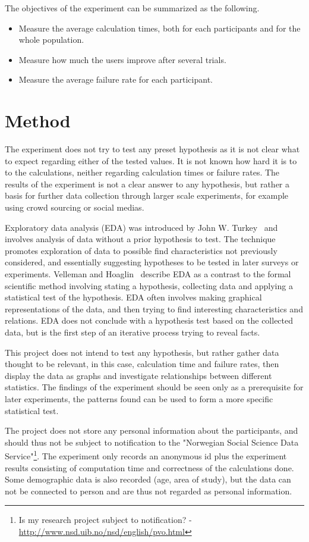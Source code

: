 \par The objectives of the experiment can be summarized as the following.
\begin{itemize}
    \item Measure the average calculation times, both for each participants and for the whole population.
    \item Measure how much the users improve after several trials.
    \item Measure the average failure rate for each participant.
\end{itemize}


\section{Method}
The experiment does not try to test any preset hypothesis as it is not clear what to expect regarding either of the tested values. It is not known how hard it is to to the calculations, neither regarding calculation times or failure rates. The results of the experiment is not a clear answer to any hypothesis, but rather a basis for further data collection through larger scale experiments, for example using crowd sourcing or social medias.

\par Exploratory data analysis (EDA) was introduced by John W. Turkey~\cite{turkey} and involves analysis of data without a prior hypothesis to test. The technique promotes exploration of data to possible find characteristics not previously considered, and essentially suggesting hypotheses to be tested in later surveys or experiments. Velleman and Hoaglin~\cite{exploratory-analysis} describe EDA as a contrast to the formal scientific method involving stating a hypothesis, collecting data and applying a statistical test of the hypothesis. EDA often involves making graphical representations of the data, and then trying to find interesting characteristics and relations. EDA does not conclude with a hypothesis test based on the collected data, but is the first step of an iterative process trying to reveal facts. 
\par This project does not intend to test any hypothesis, but rather gather data thought to be relevant, in this case, calculation time and failure rates, then display the data as graphs and investigate relationships between different statistics. The findings of the experiment should be seen only as a prerequisite for later experiments, the patterns found can be used to form a more specific statistical test.
\begin{remark}
 The project does not store any personal information about the participants, and should thus not be subject to notification to the "Norwegian Social Science Data Service"\footnote{Is my research project subject to notification? - \url{http://www.nsd.uib.no/nsd/english/pvo.html}}. The experiment only records an anonymous id plus the experiment results consisting of computation time and correctness of the calculations done. Some demographic data is also recorded (age, area of study), but the data can not be connected to person and are thus not regarded as personal information.
 \end{remark}

